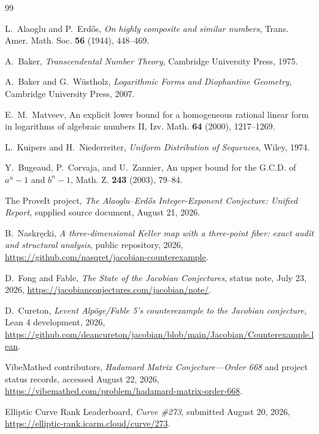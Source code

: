 \documentclass[11pt,oneside]{article}
\theoremstyle{definition}
\theoremstyle{remark}
\begin{document}
\begin{thebibliography}{99}
\small

L.~Alaoglu and P.~Erd\H{o}s,
\newblock \emph{On highly composite and similar numbers},
\newblock Trans. Amer. Math. Soc. \textbf{56} (1944), 448--469.

A.~Baker,
\newblock \emph{Transcendental Number Theory},
\newblock Cambridge University Press, 1975.

A.~Baker and G.~W\"ustholz,
\newblock \emph{Logarithmic Forms and Diophantine Geometry},
\newblock Cambridge University Press, 2007.

E.~M.~Matveev,
\newblock An explicit lower bound for a homogeneous rational linear form in logarithms of algebraic numbers II,
\newblock Izv. Math. \textbf{64} (2000), 1217--1269.

L.~Kuipers and H.~Niederreiter,
\newblock \emph{Uniform Distribution of Sequences},
\newblock Wiley, 1974.

Y.~Bugeaud, P.~Corvaja, and U.~Zannier,
\newblock An upper bound for the G.C.D. of $a^n-1$ and $b^n-1$,
\newblock Math. Z. \textbf{243} (2003), 79--84.

The ProveIt project,
\newblock \emph{The Alaoglu--Erd\H{o}s Integer-Exponent Conjecture: Unified Report},
\newblock supplied source document, August 21, 2026.

B.~Naskr\k{e}cki,
\newblock \emph{A three-dimensional Keller map with a three-point fiber: exact audit and structural analysis},
\newblock public repository, 2026,
\newblock \url{https://github.com/nasqret/jacobian-counterexample}.

D.~Fong and Fable,
\newblock \emph{The State of the Jacobian Conjectures},
\newblock status note, July 23, 2026,
\newblock \url{https://jacobianconjectures.com/jacobian/note/}.

D.~Cureton,
\newblock \emph{Levent Alp\"oge/Fable 5's counterexample to the Jacobian conjecture},
\newblock Lean 4 development, 2026,
\newblock \url{https://github.com/deancureton/jacobian/blob/main/Jacobian/Counterexample.lean}.

VibeMathed contributors,
\newblock \emph{Hadamard Matrix Conjecture---Order 668} and project status records,
\newblock accessed August 22, 2026,
\newblock \url{https://vibemathed.com/problem/hadamard-matrix-order-668}.

Elliptic Curve Rank Leaderboard,
\newblock \emph{Curve \#273}, submitted August 20, 2026,
\newblock \url{https://elliptic-rank.icarm.cloud/curve/273}.

\end{thebibliography}
\end{document}
